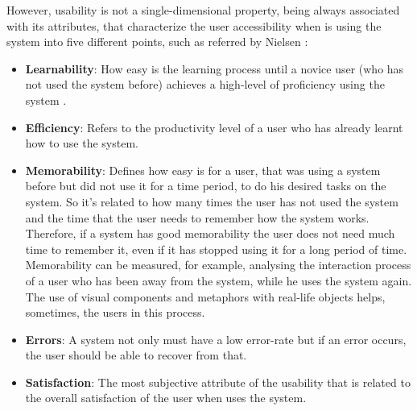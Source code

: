 However, usability is not a single-dimensional property, being always associated with its attributes, that characterize the user accessibility when is using the system into five different points, such as referred by Nielsen \cite{usabilityEngineering}:

\begin{itemize}
	\item \textbf{Learnability}: How easy is the learning process until a novice user (who has not used the system before) achieves a high-level of proficiency using the system \cite{measuringLearnabilityInHumanComputerInteraction}. %
	\item \textbf{Efficiency}: Refers to the productivity level of a user who has already learnt how to use the system. %
	\item \textbf{Memorability}: Defines how easy is for a user, that was using a system before but did not use it for a time period, to do his desired tasks on the system. So it’s related to how many times the user has not used the system and the time that the user needs to remember how the system works. Therefore, if a system has good memorability the user does not need much time to remember it, even if it has stopped using it for a long period of time. Memorability can be measured, for example, analysing the interaction process of a user who has been away from the system, while he uses the system again. The use of visual components and metaphors with real-life objects helps, sometimes, the users in this process.
	\item \textbf{Errors}: A system not only must have a low error-rate but if an error occurs, the user should be able to recover from that. %
	\item \textbf{Satisfaction}: The most subjective attribute of the usability that is related to the overall satisfaction of the user when uses the system. %
\end{itemize}

